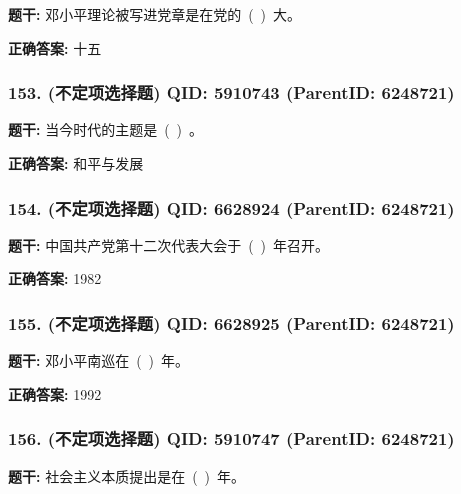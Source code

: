 \documentclass[12pt,UTF8]{ctexart}
\begin{document}
\textbf{题干:}
邓小平理论被写进党章是在党的 ( ) 大。



\textbf{正确答案:}
十五

\vspace{0.3em}\hrulefill\vspace{0.7em}

\subsubsection*{153. (不定项选择题) \small QID: 5910743 (ParentID: 6248721)}

\textbf{题干:}
当今时代的主题是 ( ) 。



\textbf{正确答案:}
和平与发展

\vspace{0.3em}\hrulefill\vspace{0.7em}

\subsubsection*{154. (不定项选择题) \small QID: 6628924 (ParentID: 6248721)}

\textbf{题干:}
中国共产党第十二次代表大会于 ( ) 年召开。



\textbf{正确答案:}
1982

\vspace{0.3em}\hrulefill\vspace{0.7em}

\subsubsection*{155. (不定项选择题) \small QID: 6628925 (ParentID: 6248721)}

\textbf{题干:}
邓小平南巡在 ( ) 年。



\textbf{正确答案:}
1992

\vspace{0.3em}\hrulefill\vspace{0.7em}

\subsubsection*{156. (不定项选择题) \small QID: 5910747 (ParentID: 6248721)}

\textbf{题干:}
社会主义本质提出是在 ( ) 年。
\end{document}
